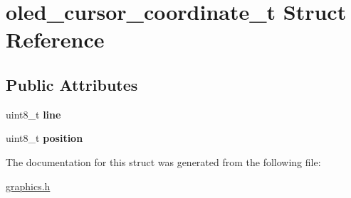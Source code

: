\hypertarget{structoled__cursor__coordinate__t}{}\section{oled\+\_\+cursor\+\_\+coordinate\+\_\+t Struct Reference}
\label{structoled__cursor__coordinate__t}
\subsection*{Public Attributes}
\begin{DoxyCompactItemize}
\item 
\mbox{\label{structoled__cursor__coordinate__t_ab0b957c785b9e6df247e61c910fa4059}} 
uint8\+\_\+t {\bfseries line}
\item 
\mbox{\label{structoled__cursor__coordinate__t_a74127e1e3663a27517196bfdc47873db}} 
uint8\+\_\+t {\bfseries position}
\end{DoxyCompactItemize}


The documentation for this struct was generated from the following file\+:\begin{DoxyCompactItemize}
\item 
\hyperlink{graphics_8h}{graphics.\+h}\end{DoxyCompactItemize}
